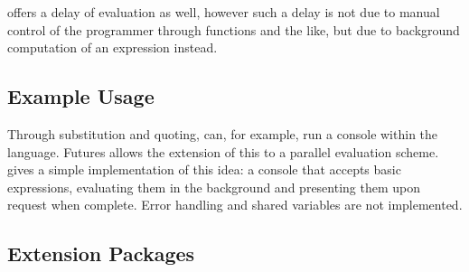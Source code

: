  offers a delay of evaluation as well, however such a delay is not
due to manual control of the programmer through
 functions and the like, but due
to background computation of an expression instead.

\subsection{Example Usage}\label{subsec:examples}

Through substitution and quoting, \R{} can, for example, run a console within the language.
Futures allows the extension of this to a parallel evaluation scheme.
 gives a simple
implementation of this idea: a console that accepts basic expressions,
evaluating them in the background and presenting them upon request when
complete.
Error handling and shared variables are not implemented.


\subsection{Extension Packages}\label{subsec:extension-packages}

